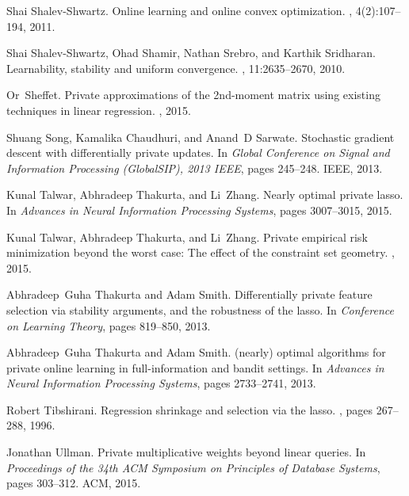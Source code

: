 \documentclass{article}
\theoremstyle{plain}
\begin{document}
\begin{thebibliography}{10}
Shai Shalev-Shwartz.
\newblock Online learning and online convex optimization.
, 4(2):107--194,
  2011.

Shai Shalev-Shwartz, Ohad Shamir, Nathan Srebro, and Karthik Sridharan.
\newblock Learnability, stability and uniform convergence.
, 11:2635--2670, 2010.

Or~Sheffet.
\newblock Private approximations of the 2nd-moment matrix using existing
  techniques in linear regression.
, 2015.

Shuang Song, Kamalika Chaudhuri, and Anand~D Sarwate.
\newblock Stochastic gradient descent with differentially private updates.
\newblock In {\em Global Conference on Signal and Information Processing
  (GlobalSIP), 2013 IEEE}, pages 245--248. IEEE, 2013.

Kunal Talwar, Abhradeep Thakurta, and Li~Zhang.
\newblock Nearly optimal private lasso.
\newblock In {\em Advances in Neural Information Processing Systems}, pages
  3007--3015, 2015.

Kunal Talwar, Abhradeep Thakurta, and Li~Zhang.
\newblock Private empirical risk minimization beyond the worst case: The effect
  of the constraint set geometry.
, 2015.

Abhradeep~Guha Thakurta and Adam Smith.
\newblock Differentially private feature selection via stability arguments, and
  the robustness of the lasso.
\newblock In {\em Conference on Learning Theory}, pages 819--850, 2013.

Abhradeep~Guha Thakurta and Adam Smith.
\newblock (nearly) optimal algorithms for private online learning in
  full-information and bandit settings.
\newblock In {\em Advances in Neural Information Processing Systems}, pages
  2733--2741, 2013.

Robert Tibshirani.
\newblock Regression shrinkage and selection via the lasso.
, pages 267--288, 1996.

Jonathan Ullman.
\newblock Private multiplicative weights beyond linear queries.
\newblock In {\em Proceedings of the 34th ACM Symposium on Principles of
  Database Systems}, pages 303--312. ACM, 2015.


\end{thebibliography}
\end{document}
